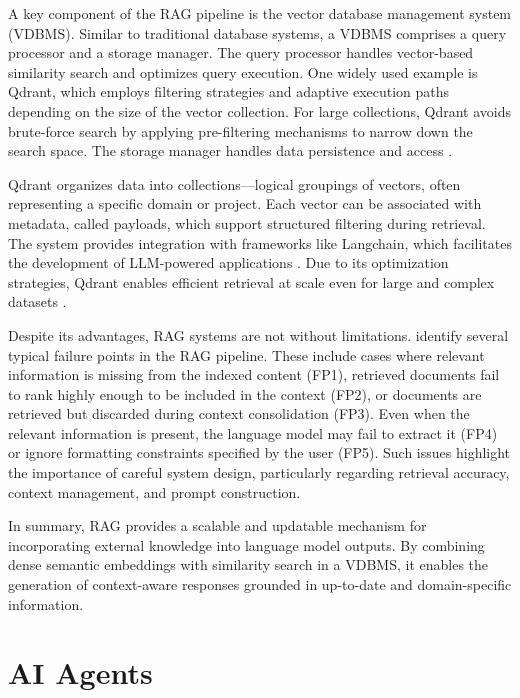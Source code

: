 \documentclass[a4paper,oneside,bibliography=totoc]{scrbook}
\begin{document}
A key component of the \ac{RAG} pipeline is the vector database management system (\ac{VDBMS}). Similar to traditional database systems, a \ac{VDBMS} comprises a query processor and a storage manager. The query processor handles vector-based similarity search and optimizes query execution. One widely used example is Qdrant, which employs filtering strategies and adaptive execution paths depending on the size of the vector collection. For large collections, Qdrant avoids brute-force search by applying pre-filtering mechanisms to narrow down the search space. The storage manager handles data persistence and access \cite{Pan2024,Qdrant2025}.

Qdrant organizes data into collections—logical groupings of vectors, often representing a specific domain or project. Each vector can be associated with metadata, called payloads, which support structured filtering during retrieval. The system provides integration with frameworks like Langchain, which facilitates the development of LLM-powered applications \cite{LangChain2025d}. Due to its optimization strategies, Qdrant enables efficient retrieval at scale even for large and complex datasets \cite{Pan2024,Qdrant2025}.

Despite its advantages, RAG systems are not without limitations. \citet{Barnett2024} identify several typical failure points in the RAG pipeline. These include cases where relevant information is missing from the indexed content (FP1), retrieved documents fail to rank highly enough to be included in the context (FP2), or documents are retrieved but discarded during context consolidation (FP3). Even when the relevant information is present, the language model may fail to extract it (FP4) or ignore formatting constraints specified by the user (FP5). Such issues highlight the importance of careful system design, particularly regarding retrieval accuracy, context management, and prompt construction.

In summary, \ac{RAG} provides a scalable and updatable mechanism for incorporating external knowledge into language model outputs. By combining dense semantic embeddings with similarity search in a \ac{VDBMS}, it enables the generation of context-aware responses grounded in up-to-date and domain-specific information.

\section{AI Agents}
\label{sec:ai_agents}
\end{document}
